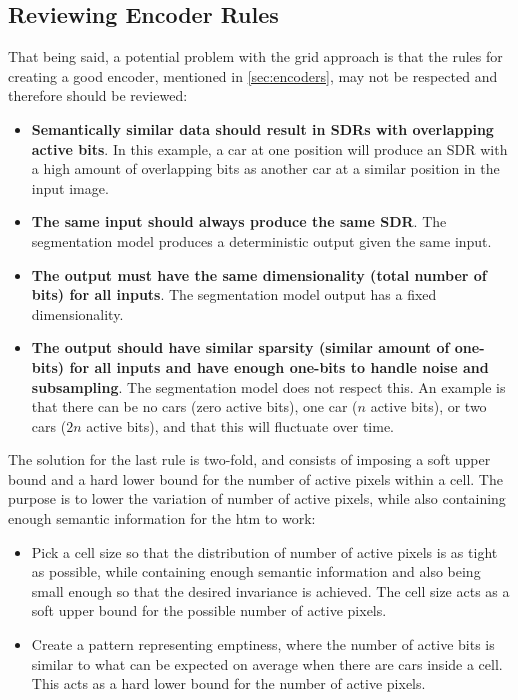 \subsection{Reviewing Encoder Rules}
That being said, a potential problem with the grid approach is that the rules for creating a good encoder, mentioned in \autoref{sec:encoders}, may not be respected and therefore should be reviewed:
\begin{itemize}
    \item \textbf{Semantically similar data should result in SDRs with overlapping active bits}. In this example, a car at one position will produce an SDR with a high amount of overlapping bits as another car at a similar position in the input image.
    \item \textbf{The same input should always produce the same SDR}. The segmentation model produces a deterministic output given the same input.
    \item \textbf{The output must have the same dimensionality (total number of bits) for all inputs}. The segmentation model output has a fixed dimensionality.
    \item \textbf{The output should have similar sparsity (similar amount of one-bits) for all inputs and have enough one-bits to handle noise and subsampling}. The segmentation model does not respect this. An example is that there can be no cars (zero active bits), one car ($n$ active bits), or two cars ($2n$ active bits), and that this will fluctuate over time.
\end{itemize}
The solution for the last rule is two-fold, and  consists of imposing a soft upper bound and a hard lower bound for the number of active pixels within a cell. The purpose is to lower the variation of number of active pixels, while also containing enough semantic information for the \gls*{htm} to work:
\begin{itemize}
    \item Pick a cell size so that the distribution of number of active pixels is as tight as possible, while containing enough semantic information and also being small enough so that the desired invariance is achieved. The cell size acts as a soft upper bound for the possible number of active pixels.
    \item Create a pattern representing emptiness, where the number of active bits is similar to what can be expected on average when there are cars inside a cell. This acts as a hard lower bound for the number of active pixels.
\end{itemize}
